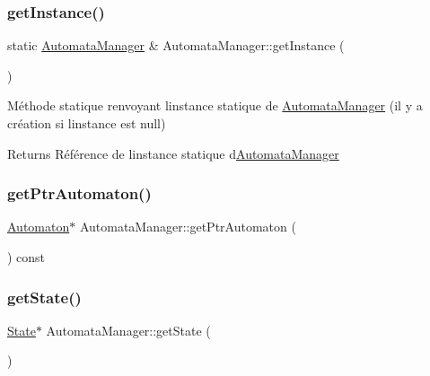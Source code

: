 \subsubsection{\texorpdfstring{get\+Instance()}{getInstance()}}
{\footnotesize\ttfamily static \mbox{\hyperlink{class_automata_manager}{Automata\+Manager}} \& Automata\+Manager\+::get\+Instance (\begin{DoxyParamCaption}{ }\end{DoxyParamCaption})\hspace{0.3cm}{\ttfamily [static]}}



Méthode statique renvoyant l\textquotesingle{}instance statique de \mbox{\hyperlink{class_automata_manager}{Automata\+Manager}} (il y a création si l\textquotesingle{}instance est null) 

\begin{DoxyReturn}{Returns}
Référence de l\textquotesingle{}instance statique d\textquotesingle{}\mbox{\hyperlink{class_automata_manager}{Automata\+Manager}} 
\end{DoxyReturn}
\mbox{\label{class_automata_manager_a7c7cdad76b400d996bcb6294e8ee49a1}} 
\subsubsection{\texorpdfstring{get\+Ptr\+Automaton()}{getPtrAutomaton()}}
{\footnotesize\ttfamily \mbox{\hyperlink{class_automaton}{Automaton}}$\ast$ Automata\+Manager\+::get\+Ptr\+Automaton (\begin{DoxyParamCaption}{ }\end{DoxyParamCaption}) const\hspace{0.3cm}{\ttfamily [inline]}}

\mbox{\label{class_automata_manager_a8b4f4aeec453227f833bbd21cd8b7634}} 
\subsubsection{\texorpdfstring{get\+State()}{getState()}}
{\footnotesize\ttfamily \mbox{\hyperlink{class_state}{State}}$\ast$ Automata\+Manager\+::get\+State (\begin{DoxyParamCaption}{ }\end{DoxyParamCaption})\hspace{0.3cm}{\ttfamily [inline]}}

